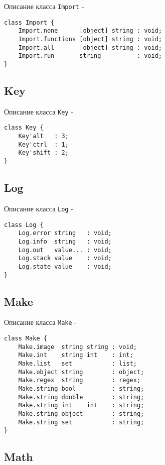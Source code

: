\noindent Описание класса \texttt{Import} -
\begin{verbatim}
class Import {
    Import.none      [object] string : void;
	Import.functions [object] string : void;
	Import.all       [object] string : void;
	Import.run       string          : void;
}
\end{verbatim}

\subsection{{\color{orange} Key}}

\noindent Описание класса \texttt{Key} -
\begin{verbatim}
class Key {
    Key'alt   : 3;
	Key'ctrl  : 1;
	Key'shift : 2;
}
\end{verbatim}

\subsection{{\color{orange} Log}}

\noindent Описание класса \texttt{Log} -
\begin{verbatim}
class Log {
    Log.error string   : void;
	Log.info  string   : void;
	Log.out   value... : void;
	Log.stack value    : void;
	Log.state value    : void;
}
\end{verbatim}

\subsection{{\color{orange} Make}}

\noindent Описание класса \texttt{Make} -
\begin{verbatim}
class Make {
    Make.image  string string : void;
	Make.int    string int    : int;
	Make.list   set           : list;
	Make.object string        : object;
	Make.regex  string        : regex;
	Make.string bool          : string;
	Make.string double        : string;
	Make.string int    int    : string;
	Make.string object        : string;
	Make.string set           : string;
}
\end{verbatim}

\subsection{{\color{orange} Math}}

